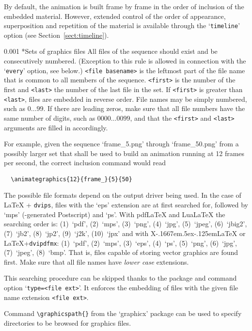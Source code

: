 \documentclass[a4paper]{article}
\makeatletter
\newcommand\myparagraph{\@startsection{paragraph}{3}{\z@}%
                                     {\parskip}%
                                     {0.001\parskip}%
                                     {\itshape\normalsize}}
\def\XeLaTeX{X\kern-.1667em\lower.5ex\hbox{\reflectbox{E}}\kern-.125em\LaTeX}
\makeatother
\begin{document}
By default, the animation is built frame by frame in the order of inclusion of the embedded material. However, extended control of the order of appearance, superposition and repetition of the material is available through the `\verb+timeline+' option (see Section~\ref{sect:timeline}).

\myparagraph*{Sets of graphics files}
All files of the sequence should exist and be consecutively numbered. (Exception to this rule is allowed in connection with the `\verb+every+' option, see below.) {\tt <file base\-name>} is the leftmost part of the file name that is common to all members of the sequence. \verb+<first>+ is the number of the first and \verb+<last>+ the number of the last file in the set. If \verb+<first>+ is greater than \verb+<last>+, files are embedded in reverse order. File names may be simply numbered, such as $0\dots99$. If there are leading zeros, make sure that all file numbers have the same number of digits, such as $0000\dots0099$, and that the \verb+<first>+ and \verb+<last>+ arguments are filled in accordingly.

For example, given the sequence `frame\_5.png' through `frame\_50.png' from a possibly larger set that shall be used to build an animation running at 12 frames per second, the correct inclusion command would read
\begin{verbatim}
  \animategraphics{12}{frame_}{5}{50}
\end{verbatim}

The possible file formats depend on the output driver being used. In the case of \LaTeX{} + \verb+dvips+, files with the `eps' extension are at first searched for, followed by `mps' (\MP-generated Postscript) and `ps'. With pdf\LaTeX{} and Lua\LaTeX{} the searching order is: (1)~`pdf', (2)~`mps', (3)~`png', (4)~`jpg', (5)~`jpeg', (6)~`jbig2', (7)~`jb2', (8)~`jp2'\footnotemark[1], (9)~`j2k'\footnotemark[1], (10)~`jpx'\footnotemark[1] and with \XeLaTeX{} or \LaTeX{}+\verb+dvipdfmx+: (1)~`pdf', (2)~`mps', (3)~`eps', (4)~`ps', (5)~`png', (6)~`jpg', (7)~`jpeg', (8)~`bmp'. That is, files capable of storing vector graphics are found first. Make sure that all file names have \emph{lower case} extensions.

This searching procedure can be skipped thanks to the package and command option `\verb+type=<file ext>+'. It enforces the embedding of files with the given file name extension \verb+<file ext>+.

Command \verb+\graphicspath{}+ from the `graphicx' package can be used to specify directories to be browsed for graphics files.
\end{document}

